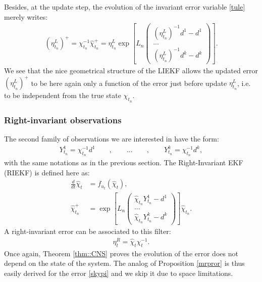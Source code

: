\documentclass[a4paper,12pt,onecolumn]{article}
\begin{document}
Besides, at the update step, the evolution of the invariant error variable \eqref{tule} merely writes:
\begin{align}
(\eta_{t_n}^L)^+ = \chi_{t_n}^{-1} \hat{\chi}_{t_n}^+
= \eta_{t_n}^L \exp \left[ L_n
\begin{pmatrix}
(\eta_{t_n}^L)^{-1} d^1 -  d^1  \\
... \\
(\eta_{t_n}^L)^{-1} d^k -  d^k 
\end{pmatrix} \right].\label{update:evolution:left:eq}
\end{align}
We see that the nice geometrical structure of the LIEKF allows the updated error  $(\eta_{t_n}^L)^+$ to be here again only a function of the error just before update $\eta_{t_n}^L$, i.e. to be independent from the true state ${\chi}_{t_n}$. 



\subsubsection{Right-invariant observations}
The second family of observations we are interested in have the form:
\begin{align}\label{claudio:eq}
Y^1_{t_n} = \chi_{t_n}^{-1 } d^1 \qquad , \qquad
  ... \qquad , \qquad
Y^k_{t_n} = \chi_{t_n}^{-1} d^k,
\end{align}
with the same notations as in the previous section.
The Right-Invariant EKF (RIEKF) is defined here as:
\begin{align}
\frac{d}{dt}\hat{\chi}_t & = f_{u_t}(\hat{\chi}_t),  \label{RIEKF_propp}\\
\hat{\chi}_{t_n}^+ & = \exp \left[ L_n
\begin{pmatrix}
\hat{\chi}_{t_n} Y_{t_n}^1- d^1 \\
... \\
\hat{\chi}_{t_n} Y_{t_n}^k - d^k
\end{pmatrix} \right] \hat{\chi}_{t_n}. \label{RIEKF_update}
\end{align}
A right-invariant error can be associated to this filter:
\begin{align}\label{skypi}
\eta_t^R = \hat{\chi}_t \chi_t^{-1}.
\end{align}
Once again,  Theorem \ref{thm::CNS} proves the evolution of the error does not depend on the state of the system. The analog of Proposition \ref{mrpror} is thus easily derived for the error \eqref{skypi} and we skip it due to space limitations.
\end{document}
